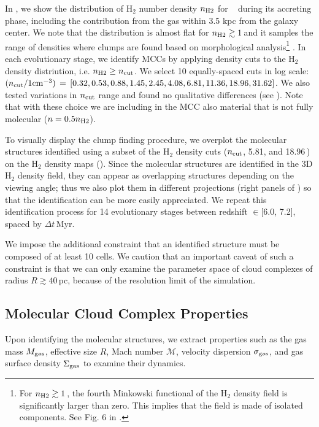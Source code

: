 \IfFileExists{emulateapjlegacy.cls}{\documentclass[iop]{emulateapjlegacy}}{\documentclass[iop]{emulateapj}}
\begin{document}
In , we show the distribution of H$_2$ number density $n_{\rm H2}$ for \flower~ during its accreting phase, including the contribution from the gas within 3.5 kpc from the galaxy center.
%
We note that the distribution is almost flat for $n_{\rm H2}\gtrsim1$\,\cc and it samples the range of densities where clumps are found based on morphological analysis\footnote{For $n_{\rm H2}\gtrsim1$\,\cc, the fourth Minkowski functional of the H$_{2}$ density field is significantly larger than zero. This implies that the field is made of isolated components. See Fig. 6 in \citet{Pallottini17b}.} \citep{Pallottini17b}.
%
In each evolutionary stage, we identify MCCs by applying density cuts to the H$_2$ density distriution, i.e. $n_{\rm H2}\geq n_{\rm cut}$. We select 10 equally-spaced cuts in log scale: ${(n_{\rm cut}/{1 {\rm cm}^{-3})}}\,=\,[0.32, 0.53, 0.88, 1.45, 2.45, 4.08, 6.81, 11.36, 18.96, 31.62]$. We also tested variations in $n_{\rm cut}$ range and found no qualitative differences (see ). Note that with these choice we are including in the MCC also material that is not fully molecular ($n = 0.5 n_{\rm H2}$).

To visually display the clump finding procedure, we overplot the molecular structures identified using a subset of the H$_2$ density cuts ($n_{\rm cut}$, 5.81, and 18.96\,\cc) on the H$_2$ density maps (). Since the molecular structures are identified in the 3D H$_2$ density field, they can appear as overlapping structures depending on the viewing angle; thus we also plot them in different projections (right panels of ) so that the identification can be more easily appreciated.
%
We repeat this identification process for 14 evolutionary stages between redshift \z$\in$[6.0, 7.2], spaced by $\Delta t$\,Myr.

We impose the additional constraint that an identified structure must be composed of at least 10 cells. We caution that an important caveat of such a constraint is that we can only examine the parameter space of cloud complexes of radius $R\gtrsim 40$\,pc, because of the resolution limit of the simulation.

\subsection{Molecular Cloud Complex Properties} \label{sec:distribution}

Upon identifying the molecular structures, we extract properties such as the gas mass $M_{\rm gas}$, effective size $R$, Mach number
$\mathcal{M}$, velocity dispersion $\sigma_{\rm gas}$, and gas surface density $\Sigma_{\rm gas}$ to examine their dynamics.
\end{document}

